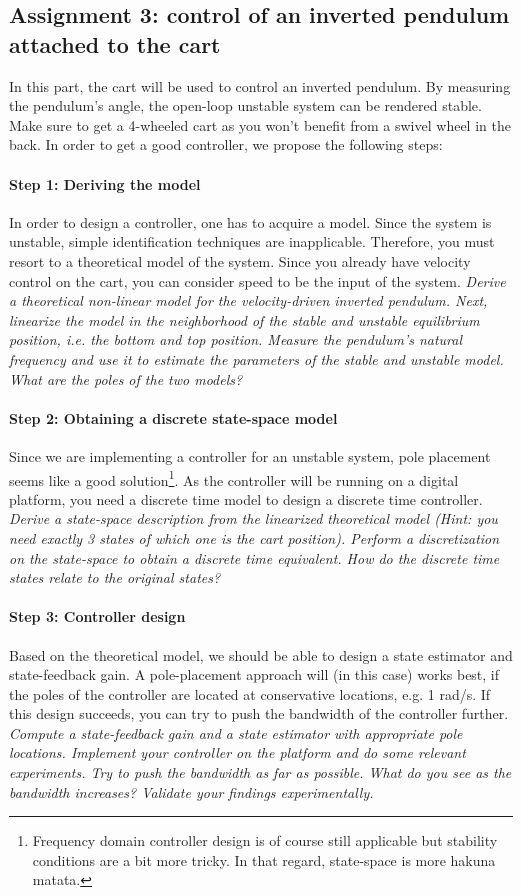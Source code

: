 \documentclass[10pt,a4paper]{article}
\begin{document}
\subsection{Assignment 3: control of an inverted pendulum attached to the cart}
In this part, the cart will be used to control an inverted pendulum. By measuring the pendulum's angle, the open-loop unstable system can be rendered stable. Make sure to get a 4-wheeled cart as you won't benefit from a swivel wheel in the back. In order to get a good controller, we propose the following steps:
\paragraph{Step 1: Deriving the model} In order to design a controller, one has to acquire a model. Since the system is unstable, simple identification techniques are inapplicable. Therefore, you must resort to a theoretical model of the system. Since you already have velocity control on the cart, you can consider speed to be the input of the system. \textit{Derive a theoretical non-linear model for the velocity-driven inverted pendulum. Next, linearize the model in the neighborhood of the stable and unstable equilibrium position, i.e. the bottom and top position. Measure the pendulum's natural frequency and use it to estimate the parameters of the stable and unstable model. What are the poles of the two models?}
\paragraph{Step 2: Obtaining a discrete state-space model} Since we are implementing a controller for an unstable system, pole placement seems like a good solution\footnote{Frequency domain controller design is of course still applicable but stability conditions are a bit more tricky. In that regard, state-space is more hakuna matata.}. As the controller will be running on a digital platform, you need a discrete time model to design a discrete time controller. \textit{Derive a state-space description from the linearized theoretical model (Hint: you need exactly 3 states of which one is the cart position). Perform a discretization on the state-space to obtain a discrete time equivalent. How do the discrete time states relate to the original states?}
\paragraph{Step 3: Controller design} Based on the theoretical model, we should be able to design a state estimator and state-feedback gain. A pole-placement approach will (in this case) works best, if the poles of the controller are located at conservative locations, e.g. 1 rad/s. If this design succeeds, you can try to push the bandwidth of the controller further. \textit{Compute a state-feedback gain and a state estimator with appropriate pole locations. Implement your controller on the platform and do some relevant experiments. Try to push the bandwidth as far as possible. What do you see as the bandwidth increases? Validate your findings experimentally.}
\end{document}
